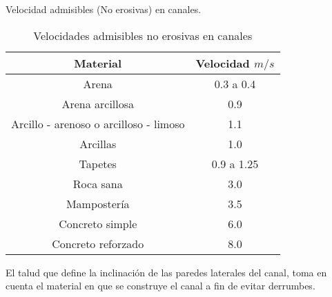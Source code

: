 Velocidad admisibles (No erosivas) en canales.
\begin{table}[h!]
    \centering
    \begin{tabular}{@{}cc@{}}
    \toprule
    Material                               & Velocidad $m/s$ \\ \midrule
    Arena                                  & 0.3 a 0.4       \\
    Arena arcillosa                        & 0.9             \\
    Arcillo - arenoso o arcilloso - limoso & 1.1             \\
    Arcillas                               & 1.0             \\
    Tapetes                                & 0.9 a 1.25      \\
    Roca sana                              & 3.0             \\
    Mampostería                            & 3.5             \\
    Concreto simple                        & 6.0             \\
    Concreto reforzado                     & 8.0             \\ \bottomrule
    \end{tabular}
    \caption{Velocidades admisibles no erosivas en canales}
    \label{tabhb39}
\end{table}
El talud que define la inclinación de las paredes laterales del canal, toma en cuenta el material en que se construye el canal a fin de evitar derrumbes.
